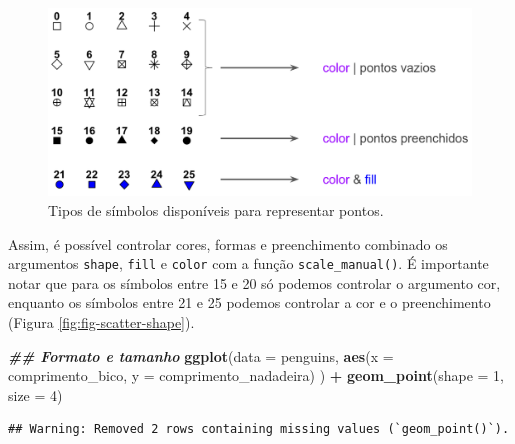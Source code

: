 \documentclass[
]{article}
\newenvironment{Shaded}{\begin{snugshade}}{\end{snugshade}}
\newcommand{\AttributeTok}[1]{\textcolor[rgb]{0.13,0.29,0.53}{#1}}
\newcommand{\DecValTok}[1]{\textcolor[rgb]{0.00,0.00,0.81}{#1}}
\newcommand{\DocumentationTok}[1]{\textcolor[rgb]{0.56,0.35,0.01}{\textbf{\textit{#1}}}}
\newcommand{\FunctionTok}[1]{\textcolor[rgb]{0.13,0.29,0.53}{\textbf{#1}}}
\newcommand{\NormalTok}[1]{#1}
\newcommand{\SpecialCharTok}[1]{\textcolor[rgb]{0.81,0.36,0.00}{\textbf{#1}}}
\begin{document}
\begin{figure}

{\centering \includegraphics[width=0.5\linewidth]{figures/cap06_fig02} 

}

\caption{Tipos de símbolos disponíveis para representar pontos.}\label{fig:fig-point-shape}
\end{figure}

Assim, é possível controlar cores, formas e preenchimento combinado os argumentos \texttt{shape}, \texttt{fill} e \texttt{color} com a função \texttt{scale\_manual()}. É importante notar que para os símbolos entre 15 e 20 só podemos controlar o argumento cor, enquanto os símbolos entre 21 e 25 podemos controlar a cor e o preenchimento (Figura \ref{fig:fig-scatter-shape}).

\begin{Shaded}
\begin{Highlighting}[]
\DocumentationTok{\#\# Formato e tamanho}
\FunctionTok{ggplot}\NormalTok{(}\AttributeTok{data =}\NormalTok{ penguins, }
       \FunctionTok{aes}\NormalTok{(}\AttributeTok{x =}\NormalTok{ comprimento\_bico, }\AttributeTok{y =}\NormalTok{ comprimento\_nadadeira)}
\NormalTok{       ) }\SpecialCharTok{+}
    \FunctionTok{geom\_point}\NormalTok{(}\AttributeTok{shape =} \DecValTok{1}\NormalTok{, }\AttributeTok{size =} \DecValTok{4}\NormalTok{)}
\end{Highlighting}
\end{Shaded}

\begin{verbatim}
## Warning: Removed 2 rows containing missing values (`geom_point()`).
\end{verbatim}
\end{document}
